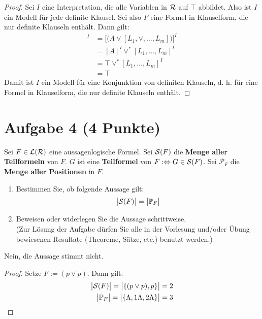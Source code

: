 \begin{proof}
Sei $I$ eine Interpretation, die alle Variablen in $\RR$ auf $\top$ abbildet. Also ist $I$ ein Modell für jede definite Klausel.
Sei also $F$ eine Formel in Klauselform, die nur definite Klauseln enthält. Dann gilt:
\begin{align*}
[A,L_1,\ldots,L_m]^I
&=\Big[\big(A\vee[L_1,\vee,\ldots,L_m]\big)\Big]^I\\
&=[A]^I\vee^\ast[L_1,\ldots,L_m]^I\\
&=\top\vee^\ast[L_1,\ldots,L_m]^I\\
&=\top
\end{align*}
Damit ist $I$ ein Modell für eine Konjunktion von definiten Klauseln, d. h. für eine Formel in Klauselform, die nur definite Klauseln enthält.
\end{proof}

\section*{Aufgabe 4 (4 Punkte)}
Sei $F\in\L(\RR)$ eine aussagenlogische Formel. Sei $\S(F)$ die  \textbf{Menge aller Teilformeln} von $F$. $G$ ist eine \textbf{Teilformel} von $F:\gdw G\in \S(F)$. Sei $\mathcal{P}_F$ die \textbf{Menge aller Positionen} in $F$.
\begin{enumerate}
\item Bestimmen Sie, ob folgende Aussage gilt:
\begin{align*}
\big|\S(F)\big|=\big|\P_F\big|
\end{align*}
\item Beweisen oder widerlegen Sie die Aussage schrittweise.\\
(Zur Lösung der Aufgabe dürfen Sie alle in der Vorlesung und/oder Übung bewiesenen Resultate (Theoreme, Sätze, etc.) benutzt werden.)
\end{enumerate}
\begin{lösung}
Nein, die Aussage stimmt nicht.
\begin{proof}
Setze $F:=(p\vee p)$. Dann gilt:
\begin{align*}
\big|\S(F)\big|=\big|\lbrace(p\vee p),p\rbrace\big|=2\\
\big|\P_F\big|=\big|\lbrace\Lambda,1\Lambda,2\Lambda\rbrace\big|=3
\end{align*}
\end{proof}
\end{lösung}

